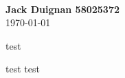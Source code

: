 \documentclass[12pt]{article}
\begin{document}
\begin{titlepage}
    \centering
    \vfill
    \textbf{\Large \\}
    \vspace{1cm}
    \textbf{Jack Duignan 58025372\\}
    \today
    \vfill
    \vfill
    \vfill
\end{titlepage}

\newpage




test

test test

% 

% 
\end{document}
